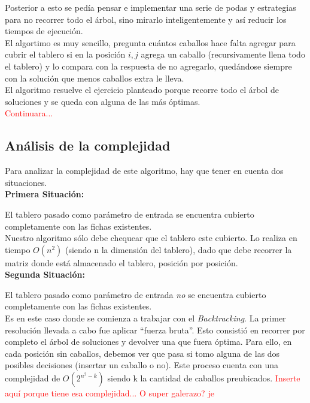 Posterior a esto se ped\'ia pensar e implementar una serie de podas y estrategias para no recorrer todo el \'arbol, sino mirarlo inteligentemente y as\'i reducir los tiempos de ejecuci\'on.\\

El algortimo es muy sencillo, pregunta cu\'antos caballos hace falta agregar para cubrir el tablero si en la posici\'on $i, j$ agrega un caballo (recursivamente llena todo el tablero) y lo compara con la respuesta de no agregarlo, qued\'andose siempre con la soluci\'on que menos caballos extra le lleva.\\

El algoritmo resuelve el ejercicio planteado porque recorre todo el \'arbol de soluciones y se queda con alguna de las m\'as \'optimas.\\

\textcolor{red}{Continuara...}

\newpage

\subsection{An\'alisis de la complejidad}


Para analizar la complejidad de este algoritmo, hay que tener en cuenta dos situaciones.\\

\textbf{Primera Situaci\'on: }

El tablero pasado como par\'ametro de entrada se encuentra cubierto completamente con las fichas existentes.\\

Nuestro algoritmo s\'olo debe chequear que el tablero este cubierto. Lo realiza en tiempo $O(n^{2})$ (siendo n la dimensi\'on del tablero), dado que debe recorrer la matriz donde est\'a almacenado el tablero, posici\'on por posici\'on.\\



\textbf{Segunda Situaci\'on: }

El tablero pasado como par\'ametro de entrada \emph{no} se encuentra cubierto completamente con las fichas existentes.\\

Es en este caso donde se comienza a trabajar con el \emph{Backtracking}. La primer resoluci\'on llevada a cabo fue aplicar ``fuerza bruta''. Esto consisti\'o en recorrer por completo el \'arbol de soluciones y devolver una que fuera \'optima. Para ello, en cada posici\'on sin caballos, debemos ver que pasa si tomo alguna de las dos posibles decisiones (insertar un caballo o no). Este proceso cuenta con una complejidad de $O(2^{n^{2} - k})$ siendo k la cantidad de caballos preubicados. \textcolor{red}{Inserte aqu\'i porque tiene esa complejidad... O super galerazo? je}\\

